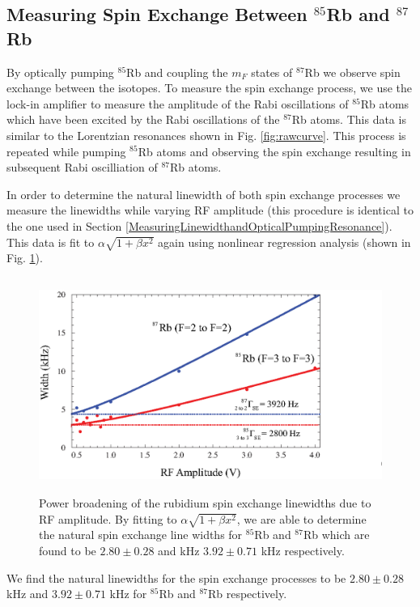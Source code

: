 \subsection{Measuring Spin Exchange Between $^{85}$Rb and $^{87}$Rb}\label{MeasuringSpinExchange}
By optically pumping $^{85}$Rb and coupling the $m_F$ states of $^{87}$Rb we observe spin exchange between the isotopes. To measure the spin exchange process, we use the lock-in amplifier to measure the amplitude of the Rabi oscillations of $^{85}$Rb atoms which have been excited by the Rabi oscillations of the $^{87}$Rb atoms.  This data is similar to the Lorentzian resonances shown in Fig. \ref{fig:rawcurve}.  This process is repeated while pumping $^{85}$Rb atoms and observing the spin exchange resulting in subsequent Rabi oscilliation of $^{87}$Rb atoms.

In order to determine the natural linewidth of both spin exchange processes we measure the linewidths while varying RF amplitude (this procedure is identical to the one used in Section \ref{MeasuringLinewidthandOpticalPumpingResonance}).  This data is fit to $\alpha \sqrt{1+\beta x^2}$ again using nonlinear regression analysis (shown in Fig. \ref{fig: spinexchange}).
\begin{figure}[htbp]
\begin{center}
\includegraphics[height=70mm]{./figures/spin_exchange.eps}
\caption{\small{Power broadening of the rubidium spin exchange linewidths due to RF amplitude. By fitting to $\alpha \sqrt{1+\beta x^2}$, we are able to determine the natural spin exchange line widths for $^{85}$Rb and $^{87}$Rb which are found to be $2.80 \pm 0.28$ and kHz $3.92 \pm 0.71$ kHz respectively.}}\label{fig: spinexchange}
\end{center}
\end{figure}
We find the natural linewidths for the spin exchange processes to be $2.80 \pm 0.28$ kHz and $3.92 \pm 0.71$ kHz for $^{85}$Rb and $^{87}$Rb respectively.